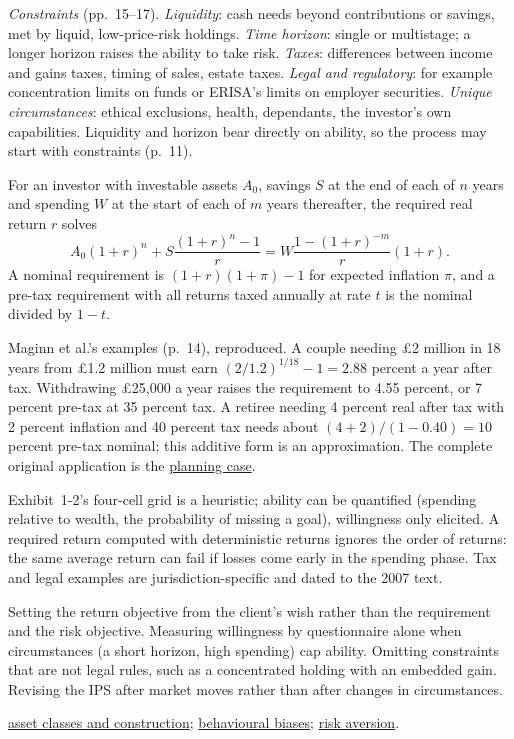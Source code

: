 \begin{qfmethod}
\emph{Constraints} (pp.~15--17). \emph{Liquidity}: cash needs beyond contributions or savings, met by liquid, low-price-risk holdings. \emph{Time horizon}: single or multistage; a longer horizon raises the ability to take risk. \emph{Taxes}: differences between income and gains taxes, timing of sales, estate taxes. \emph{Legal and regulatory}: for example concentration limits on funds or ERISA's limits on employer securities. \emph{Unique circumstances}: ethical exclusions, health, dependants, the investor's own capabilities. Liquidity and horizon bear directly on ability, so the process may start with constraints (p.~11).

 For an investor with investable assets $A_0$, savings $S$ at the end of each of $n$ years and spending $W$ at the start of each of $m$ years thereafter, the required real return $r$ solves
\[ A_0(1+r)^n+S\frac{(1+r)^n-1}{r}=W\frac{1-(1+r)^{-m}}{r}(1+r). \]
A nominal requirement is $(1+r)(1+\pi)-1$ for expected inflation $\pi$, and a pre-tax requirement with all returns taxed annually at rate $t$ is the nominal divided by $1-t$.

 Maginn et al.'s examples (p.~14), reproduced. A couple needing \pounds2 million in 18 years from \pounds1.2 million must earn $(2/1.2)^{1/18}-1=2.88$ percent a year after tax. Withdrawing \pounds25{,}000 a year raises the requirement to 4.55 percent, or 7 percent pre-tax at 35 percent tax. A retiree needing 4 percent real after tax with 2 percent inflation and 40 percent tax needs about $(4+2)/(1-0.40)=10$ percent pre-tax nominal; this additive form is an approximation. The complete original application is the \hyperref[ex:investment-planning-case]{planning case}.

 Exhibit~1-2's four-cell grid is a heuristic; ability can be quantified (spending relative to wealth, the probability of missing a goal), willingness only elicited. A required return computed with deterministic returns ignores the order of returns: the same average return can fail if losses come early in the spending phase. Tax and legal examples are jurisdiction-specific and dated to the 2007 text.

 Setting the return objective from the client's wish rather than the requirement and the risk objective. Measuring willingness by questionnaire alone when circumstances (a short horizon, high spending) cap ability. Omitting constraints that are not legal rules, such as a concentrated holding with an embedded gain. Revising the IPS after market moves rather than after changes in circumstances.

 \hyperref[meth:asset-class-portfolio-construction]{asset classes and construction}; \hyperref[def:behavioural-biases]{behavioural biases}; \hyperref[def:risk-aversion-utility]{risk aversion}.

\end{qfmethod}

